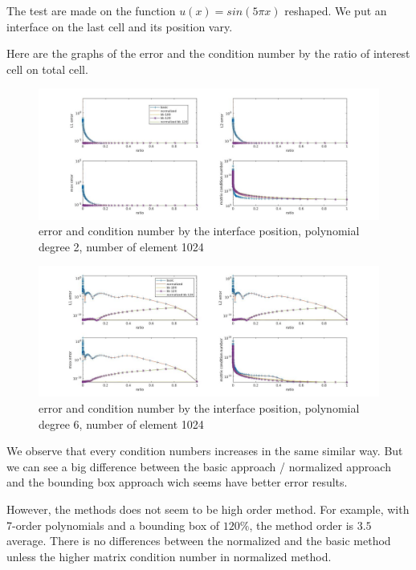 \documentclass[a4paper,10pt]{article}
\begin{document}
The test are made on the function $u(x) = sin(5\pi x)$ reshaped. We put an 
interface on the last cell and its position vary.

Here are the graphs of the error and the condition number by the ratio of 
interest cell on total cell.

\begin{figure}[hp!]
 \centering
\includegraphics[width=\textwidth]{figure/cond_N2_prec1024.jpg}
 \caption{error and condition number by the interface position, polynomial 
degree 2, number of element 1024}
\end{figure}

\begin{figure}[hp!]
 \centering
\includegraphics[width=\textwidth]{figure/cond_N6_prec1024.jpg}
 \caption{error and condition number by the interface position, polynomial 
degree 6, number of element 1024}
\end{figure}

We observe that every condition numbers increases in the same similar way. But 
we can see a big difference between the basic approach / normalized approach 
and the bounding box approach wich seems have better error results.

However, the methods does not seem to be high order method. For example, with 
7-order polynomials and a bounding box of $120\%$, the method order is $3.5$ 
average. There is no differences between the normalized and the basic method 
unless the higher matrix condition number in normalized method.
\end{document}
